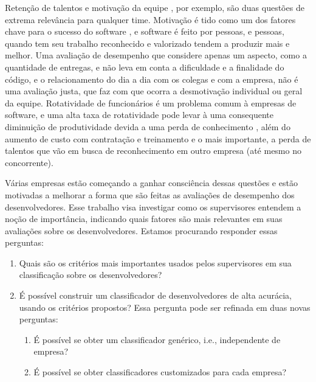 Retenção de talentos \cite{Boehm2000, Chatzoglou1997, DeMarco1987, Guzzo1988, Scudder1991, Wohlin1995, Wohlin2001} e motivação da equipe \cite{Boehm1987, DeMarco1987, Boehm1984, Jones2000, Sharp2009, Boehm1982, Boehm1988, Hantos2000}, por exemplo, são duas questões de extrema relevância para qualquer time. Motivação é tido como um dos fatores chave para o sucesso do software \cite{Sharp2009}, e software é feito por pessoas, e pessoas, quando tem seu trabalho reconhecido e valorizado tendem a produzir mais e melhor. Uma avaliação de desempenho que considere apenas um aspecto, como a quantidade de entregas, e não leva em conta a dificuldade e a finalidade do código, e o relacionamento do dia a dia com os colegas e com a empresa, não é uma avaliação justa, que faz com que ocorra a desmotivação individual ou geral da equipe. Rotatividade de funcionários é um problema comum à empresas de software\cite{Abdel-Hamid1991, Wallace2004}, e uma alta taxa de rotatividade pode levar à uma consequente diminuição de produtividade devida a uma perda de conhecimento \cite{Melo2011, Coram2005}, além do aumento de custo com contratação e treinamento e o mais importante, a perda de talentos que vão em busca de reconhecimento em outro empresa (até mesmo no concorrente).

Várias empresas estão começando a ganhar consciência dessas questões e estão motivadas a melhorar a forma que são feitas as avaliações de desempenho dos desenvolvedores. Esse trabalho visa investigar como os supervisores entendem a noção de importância, indicando quais fatores são mais relevantes em suas avaliações sobre os desenvolvedores. Estamos procurando responder essas perguntas:

\begin{enumerate}
	\item Quais são os critérios mais importantes usados pelos supervisores em sua classificação sobre os desenvolvedores?
	\item É possível construir um classificador de desenvolvedores de alta acurácia, usando os critérios propostos? Essa pergunta pode ser refinada em duas novas perguntas:
	\begin{enumerate}
		\item É possível se obter um classificador genérico, i.e., independente de empresa?
		\item É possível se obter classificadores customizados para cada empresa?
	\end{enumerate}
\end{enumerate}



